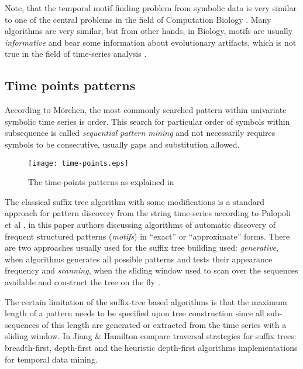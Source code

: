 Note, that the temporal motif finding problem from symbolic data is very similar to one of the central problems in the field of Computation Biology \cite{citeulike:465665}. Many algorithms are very similar, but from other hands, in Biology, motifs are usually \textit{informative} and bear some information about evolutionary artifacts, which is not true in the field of time-series analysis \cite{citeulike:3978085}.

\subsection{Time points patterns}
According to M\"orchen, the most commonly searched pattern within univariate symbolic time series is order. This search for particular order of symbols within subsequence is called \textit{sequential pattern mining} \cite{citeulike:775528} and not necessarily requires symbols to be consecutive, usually gaps and substitution allowed.

\begin{figure}[tbp]
   \centering
   \texttt{[image: time-points.eps]}
   \caption{The time-points patterns as explained in \cite{citeulike:1748833}}
   \label{fig:timepoints}
\end{figure}

The classical suffix tree algorithm \cite{citeulike:707616} with some modifications is a standard approach for pattern discovery from the string time-series according to Palopoli et al \cite{citeulike:5003338}, in this paper authors discussing algorithms of automatic discovery of frequent structured patterns (\textit{motifs}) in ``exact'' or ``approximate'' forms. There are two approaches usually used for the suffix tree building used: \textit{generative}, when algorithms generates all possible patterns and tests their appearance frequency \cite{citeulike:5012661} and \textit{scanning}, when the sliding window used to scan over the sequences available and construct the tree on the fly \cite{citeulike:5012661}. 

The certain limitation of the suffix-tree based algorithms is that the maximum length of a pattern needs to be specified upon tree construction since all sub-sequences of this length are generated or extracted from the time series with a sliding window. In \cite{citeulike:5003404} Jiang \& Hamilton compare traversal strategies for suffix trees: breadth-first, depth-first and the heuristic depth-first algorithms implementations for temporal data mining.

